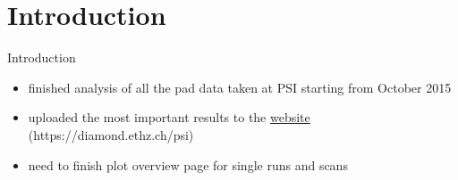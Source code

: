 \section{Introduction}
\begin{frame}{Introduction}

	\begin{itemize}\itemfill
		\item finished analysis of all the pad data taken at PSI starting from October 2015
		\item uploaded the most important results to the \href{https://diamond.ethz.ch/psi/}{website} (https://diamond.ethz.ch/psi)
		\item need to finish plot overview page for single runs and scans
	\end{itemize}

	
\end{frame}
